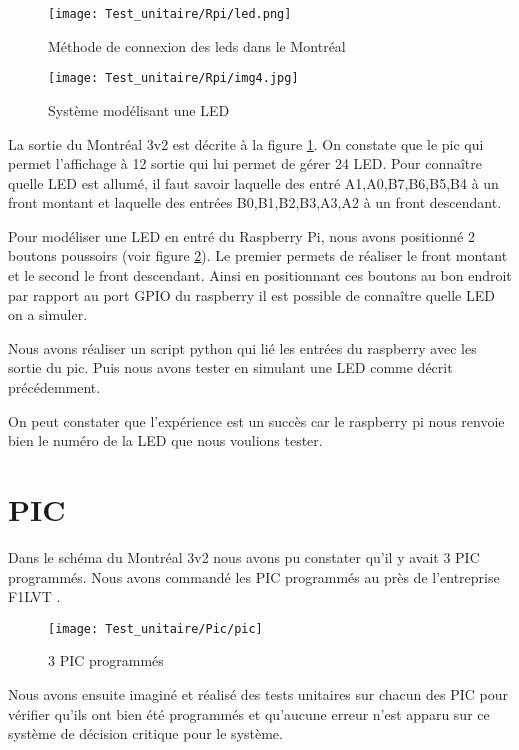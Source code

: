 \begin{figure}[!h]
  \centering
  \texttt{[image: Test\_unitaire/Rpi/led.png]}
  \caption{Méthode de connexion des leds dans le Montréal}  
  \label{figure:ledMontreal}
\end{figure}
\begin{figure}[!h]
  \centering
  \texttt{[image: Test\_unitaire/Rpi/img4.jpg]}  
  \caption{Système modélisant une LED}
  \label{figure:test}
\end{figure}

La sortie du Montréal 3v2 est décrite à la figure \ref{figure:ledMontreal}. On constate que le pic qui permet l'affichage à 12 sortie qui lui permet de gérer 24 LED. Pour connaître quelle LED est allumé, il faut savoir laquelle des entré A1,A0,B7,B6,B5,B4 à un front montant et laquelle des entrées B0,B1,B2,B3,A3,A2 à un front descendant.

Pour modéliser une LED en entré du Raspberry Pi, nous avons positionné 2 boutons poussoirs (voir figure \ref{figure:test}). Le premier permets de réaliser le front montant et le second le front descendant. Ainsi en positionnant ces boutons au bon endroit par rapport au port GPIO du raspberry il est possible de connaître quelle LED on a simuler.

Nous avons réaliser un script python qui lié les entrées du raspberry avec les sortie du pic. Puis nous avons tester en simulant une LED comme décrit précédemment.

On peut constater que l'expérience est un succès car le raspberry pi nous renvoie bien le numéro de la LED que nous voulions tester.





\section{PIC}
\label{sec:pic}

Dans le schéma du Montréal 3v2 nous avons pu constater qu'il y avait 3 PIC programmés. Nous avons commandé les PIC programmés au près de l'entreprise F1LVT \cite{montreal}.


\begin{figure}[!h]
  \centering
  \texttt{[image: Test\_unitaire/Pic/pic]}
  \caption{3 PIC programmés}
  \label{fig:pic}
\end{figure}

Nous avons ensuite imaginé et réalisé des tests unitaires sur chacun des PIC pour vérifier qu'ils ont bien été programmés et qu'aucune erreur n'est apparu sur ce système de décision critique pour le système.

